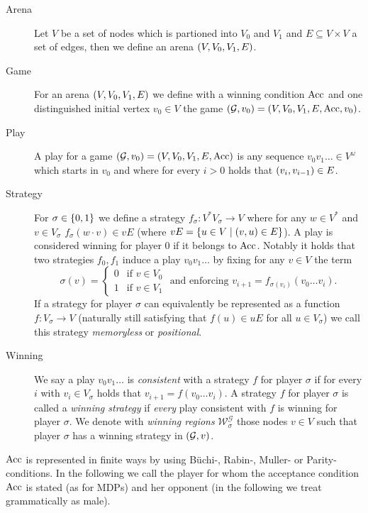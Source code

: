 \begin{definition}
  \begin{description}
    \item [Arena] Let $V$ be a set of nodes which is partioned into $V_{0}$ and
      $V_{1}$ and $E\subseteq V\times V$ a set of edges, then we define an
      arena $\left(V, V_{0}, V_{1}, E\right)$.
    \item [Game] For an arena $\left(V, V_{0}, V_{1}, E\right)$ we define with a
      winning condition $\operatorname{Acc}$ and one distinguished initial vertex
      $v_{0}\in V$ the game
      $\left(\mathcal{G}, v_{0}\right) = \left(V, V_{0}, V_{1}, E, \operatorname{Acc}, v_{0}\right)$.
    \item [Play] A play for a game $\left(\mathcal{G}, v_{0}\right) = \left(V,
      V_{0}, V_{1}, E, \operatorname{Acc}\right)$ is any sequence $v_{0}v_{1}\dots\in
      V^{\omega}$ which starts in $v_{0}$ and where for every $i > 0$ holds
      that $\left(v_{i},v_{i-1}\right)\in E$.
    \item [Strategy] For $\sigma\in\left\{0,1\right\}$ we define a strategy
      $f_{\sigma}: V^{*}V_{\sigma}\rightarrow V$ where for any $w\in V^{*}$ and
      $v\in V_{\sigma}$ $f_{\sigma}(w\cdot v)\in vE$ (where $vE =
      \left\{u\in V\mid\left(v,u\right)\in E\right\}$). A play is considered winning for
      player $0$ if it belongs to $\operatorname{Acc}$. Notably it holds that two strategies
      $f_{0}, f_{1}$ induce a play $v_{0}v_{1}\dots$ by fixing for any $v\in V$
      the term
      \begin{equation*}
        \sigma(v) = \begin{cases}
          0&\text{if }v\in V_{0}\\
          1&\text{if }v\in V_{1}
        \end{cases}\text{ and enforcing }
        v_{i+1} = f_{\sigma(v_{i})}(v_{0}\dots v_{i}).
      \end{equation*}
      If a strategy for player $\sigma$ can equivalently be represented as a
      function $f:V_{\sigma}\rightarrow V$ (naturally still satisfying that
      $f(u)\in uE$ for all $u\in V_{\sigma}$) we call this strategy
      \emph{memoryless} or \emph{positional}.
    \item [Winning] We say a play $v_{0}v_{1}\dots$ is \emph{consistent} with a
      strategy $f$ for player $\sigma$ if for every $i$ with
      $v_{i}\in V_{\sigma}$ holds that $v_{i+1} = f(v_{0}\dots v_{i})$. 
      A strategy $f$ for player $\sigma$ is called a \emph{winning strategy} if
      \emph{every} play consistent with $f$ is winning for player $\sigma$.
      We denote with \emph{winning regions}
      $\mathcal{W}^{\mathcal{G}}_{\sigma}$ those nodes $v\in V$ such that
      player $\sigma$ has a winning strategy in $\left(\mathcal{G}, v\right)$.
  \end{description}
  $\operatorname{Acc}$ is represented in finite ways by using Büchi-, Rabin-, Muller- or
  Parity-conditions. In the following we call the player for whom the
  acceptance condition $\operatorname{Acc}$ is stated \eve{} (as for \acp{MDP}) and her
  opponent \adam{} (in the following we treat \adam{} grammatically as male).
\end{definition}
